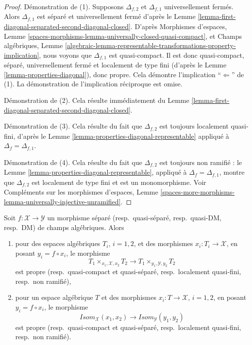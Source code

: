 \begin{proof}
Démonstration de (1). Supposons $\Delta_{f, 2}$ et $\Delta_{f, 1}$
universellement fermés. Alors $\Delta_{f, 1}$ est séparé et universellement
fermé d'après le Lemme
\ref{lemma-first-diagonal-separated-second-diagonal-closed}. D'après
Morphismes d'espaces, Lemme
\ref{spaces-morphisms-lemma-universally-closed-quasi-compact}, et Champs
algébriques, Lemme
\ref{algebraic-lemma-representable-transformations-property-implication},
nous voyons que $\Delta_{f, 1}$ est quasi-compact. Il est donc quasi-compact,
séparé, universellement fermé et localement de type fini (d'après le Lemme
\ref{lemma-properties-diagonal}), donc propre. Cela démontre l'implication
``$\Leftarrow$'' de (1). La démonstration de l'implication réciproque est
omise.

\medskip\noindent
Démonstration de (2). Cela résulte immédiatement du Lemme
\ref{lemma-first-diagonal-separated-second-diagonal-closed}.

\medskip\noindent
Démonstration de (3). Cela résulte du fait que $\Delta_{f, 2}$ est toujours
localement quasi-fini, d'après le Lemme
\ref{lemma-properties-diagonal-representable} appliqué à
$\Delta_f = \Delta_{f, 1}$.

\medskip\noindent
Démonstration de (4). Cela résulte du fait que $\Delta_{f, 2}$ est toujours
non ramifié : le Lemme \ref{lemma-properties-diagonal-representable},
appliqué à $\Delta_f = \Delta_{f, 1}$, montre que $\Delta_{f, 2}$ est
localement de type fini et est un monomorphisme. Voir Compléments sur les
morphismes d'espaces, Lemme
\ref{spaces-more-morphisms-lemma-universally-injective-unramified}.
\end{proof}

\begin{lemma}
\label{lemma-separated-implies-isom}
Soit $f : \mathcal{X} \to \mathcal{Y}$ un morphisme séparé
(resp.\ quasi-séparé, resp.\ quasi-DM, resp.\ DM) de champs algébriques.
Alors
\begin{enumerate}
\item pour des espaces algébriques $T_i$, $i = 1, 2$, et des morphismes
$x_i : T_i \to \mathcal{X}$, en posant $y_i = f \circ x_i$, le morphisme
$$
T_1 \times_{x_1, \mathcal{X}, x_2} T_2 \longrightarrow
T_1 \times_{y_1, \mathcal{Y}, y_2} T_2
$$
est propre (resp.\ quasi-compact et quasi-séparé,
resp.\ localement quasi-fini, resp.\ non ramifié),
\item pour un espace algébrique $T$ et des morphismes
$x_i : T \to \mathcal{X}$, $i = 1, 2$, en posant
$y_i = f \circ x_i$, le morphisme
$$
\mathit{Isom}_\mathcal{X}(x_1, x_2) \longrightarrow
\mathit{Isom}_\mathcal{Y}(y_1, y_2)
$$
est propre (resp.\ quasi-compact et quasi-séparé,
resp.\ localement quasi-fini, resp.\ non ramifié).
\end{enumerate}
\end{lemma}


